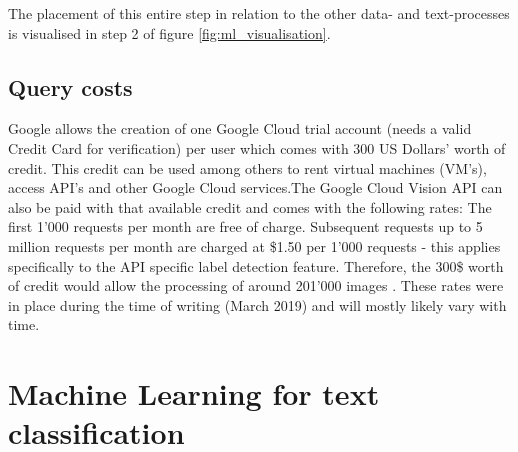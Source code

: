 The placement of this entire step in relation to the other data- and text-processes is visualised in step 2 of figure \ref{fig:ml_visualisation}.

\subsection{Query costs} \label{vision_query_cost}
Google allows the creation of one Google Cloud trial account (needs a valid Credit Card for verification) per user which comes with 300 US Dollars' worth of credit. This credit can be used among others to rent virtual machines (VM's), access API's and other Google Cloud services.The Google Cloud Vision API can also be paid with that available credit and comes with the following rates: The first 1'000 requests per month are free of charge. Subsequent requests up to 5 million requests per month are charged at \$1.50 per 1'000 requests - this applies specifically to the API specific label detection feature. Therefore, the 300\$ worth of credit would allow the processing of around 201'000 images \parencite{GoogleIn.2019}. These rates were in place during the time of writing (March 2019) and will mostly likely vary with time.

\section{Machine Learning for text classification} 
